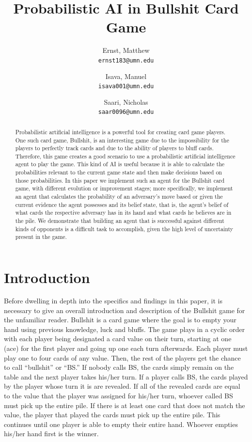 \documentclass[a4paper,11pt]{article}
\author{
  Ernst, Matthew\\
  \texttt{ernst183@umn.edu}
  \and
 Isava, Manuel\\
  \texttt{isava001@umn.edu}
\and
  Saari, Nicholas\\
  \texttt{saar0096@umn.edu}
}
\title{Probabilistic AI in Bullshit Card Game}
\begin{document}
\maketitle



\begin{abstract}
Probabilistic artificial intelligence is a powerful tool for creating card game players. One such card game, Bullshit, is an interesting game due to the impossibility for the players to perfectly track cards and due to the ability of players to bluff cards. Therefore, this game creates a good scenario to use a probabilistic artificial intelligence agent to play the game. This kind of AI is useful because it is able to calculate the probabilities relevant to the current game state and then make decisions based on those probabilities. In this paper we implement such an agent for the Bullshit card game, with different evolution or improvement stages; more specifically, we implement an agent that calculates the probability of an adversary’s move based or given the current evidence the agent possesses and its belief state, that is, the agent’s belief of what cards the respective adversary has in its hand and what cards he believes are in the pile. We demonstrate that building an agent that is successful against different kinds of opponents is a difficult task to accomplish, given the high level of uncertainty present in the game.
\end{abstract}

\section{Introduction}
	Before dwelling in depth into the specifics and findings in this paper, it is necessary to give an overall introduction and description of the Bullshit game for the unfamiliar reader. Bullshit is a card game where the goal is to empty your hand using previous knowledge, luck and bluffs. The game plays in a cyclic order with each player being designated a card value on their turn, starting at one (ace) for the first player and going up one each turn afterwards. Each player must play one to four cards of any value. Then, the rest of the players get the chance to call “bullshit” or “BS.”  If nobody calls BS, the cards simply remain on the table and the next player takes his/her turn. If a player calls BS, the  cards played by the player whose turn it is are revealed. If all of the revealed cards are equal to the value that the player was assigned for his/her turn, whoever called BS must pick up the entire pile. If there is at least one card that does not match the value, the player that played the cards must pick up the entire pile. This continues until one player is able to empty their entire hand. Whoever empties his/her hand first is the winner.
\end{document}
